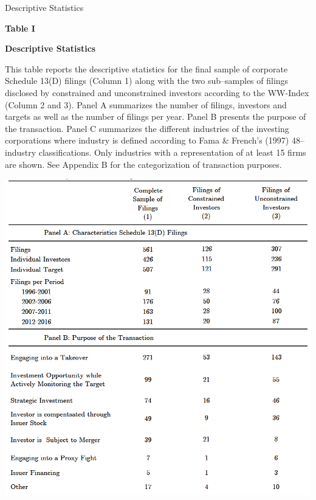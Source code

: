\documentclass[12pt]{article}
\begin{document}
\begin{table}[!htbp]
	\centering
	\captionsetup{textformat=empty,labelformat=blank}
	\caption{Descriptive Statistics}
	\textbf{Table I}\par\medskip
	\large\textbf{Descriptive Statistics}\par\medskip
	\justifying
	\footnotesize\noindent{}This table reports the descriptive statistics for the final sample of corporate Schedule 13(D) filings (Column 1) along with the two sub–samples of filings disclosed by constrained and unconstrained investors according to the WW-Index (Column 2 and 3). Panel A summarizes the number of filings, investors and targets as well as the number of filings per year. Panel B presents the purpose of the transaction. Panel C summarizes the different industries of the investing corporations where industry is defined according to Fama \& French’s (1997) 48–industry classifications. Only industries with a representation of at least 15 firms are shown. See Appendix B for the categorization of transaction purposes. \par\medskip
	\centering													
	\begin{adjustbox}{width=\textwidth}
		\includegraphics{descriptive1final}
	\end{adjustbox}\par\medskip
\end{table}
\end{document}
